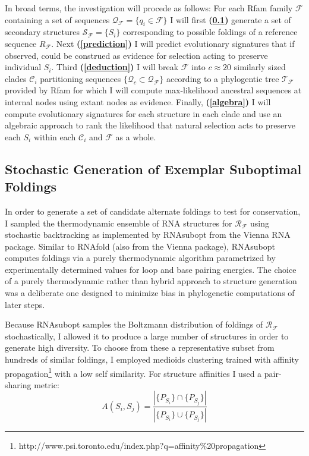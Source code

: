 \documentclass[12pt,a4paper]{article}
\begin{document}
In broad terms, the investigation will procede as follows: For each Rfam family $\mathcal{F}$ containing a set of sequences $\mathcal{Q_F} = \{q_i \in \mathcal{F}\}$ I will first \textbf{(\ref{stochastic})}  generate a set of secondary structures $\mathcal{S_F} = \{S_i\}$ corresponding  to possible foldings of a reference sequence $R_{\mathcal{F}}$. Next \textbf{(\ref{prediction})} I will predict evolutionary signatures that if observed, could be construed as evidence for selection acting to preserve individual $S_i$. Third \textbf{(\ref{deduction})} I will break $\mathcal{F}$ into $c \approx20$ similarly sized clades $\mathcal{C}_i$ partitioning sequences $\{\mathcal{Q}_c \subset \mathcal{Q_F}\} $ according to a phylogentic tree $\mathcal{T_F}$ provided by Rfam for which I will compute max-likelihood ancestral sequences at internal nodes using extant nodes as evidence. Finally, \textbf{(\ref{algebra})} I will compute evolutionary signatures for each structure in each clade and use an algebraic approach to rank the likelihood that natural selection acts to preserve each $S_i$ within each $\mathcal{C}_i$ and $\mathcal{F}$ as a whole.

\subsection{Stochastic Generation of Exemplar Suboptimal Foldings}\label{stochastic}
In order to generate a set of candidate alternate foldings to test for conservation, I sampled the thermodynamic ensemble of RNA structures for $\mathcal{R_F}$ using stochastic backtracking as implemented by RNAsubopt from the Vienna RNA package. Similar to RNAfold (also from the Vienna package), RNAsubopt computes foldings via a purely thermodynamic algorithm parametrized by experimentally determined values for loop and base pairing energies. The choice of a purely thermodynamic rather than hybrid approach to structure generation was a deliberate one designed to minimize bias in phylogenetic computations of later steps.

Because RNAsubopt samples the Boltzmann distribution of foldings of $\mathcal{R_F}$ stochastically, I allowed it to produce a large number of structures in order to generate high diversity. To choose from these a representative subset from hundreds of similar foldings, I employed medioids clustering trained with affinity propagation\footnote{http://www.psi.toronto.edu/index.php?q=affinity\%20propagation} with a low self similarity. For structure affinities I used a pair-sharing metric:
\begin{equation}
  \label{eq:pair_affinity}
  A(S_i,S_j) = \frac{\left|\{P_{S_i}\}\cap  \{P_{S_j} \} \right|}{\left|\{P_{S_i}\}\cup \{P_{S_j}\} \right|}
\end{equation}
\end{document}
